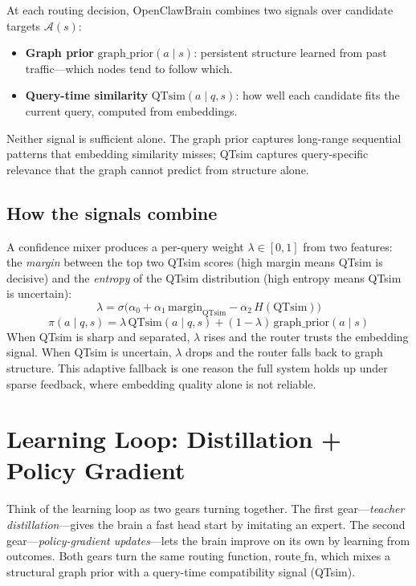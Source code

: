 \documentclass[11pt]{article}
\begin{document}
At each routing decision, OpenClawBrain combines two signals over candidate
targets $\mathcal{A}(s)$:
\begin{itemize}
  \item \textbf{Graph prior} $\mathrm{graph\_prior}(a\mid s)$: persistent
        structure learned from past traffic---which nodes tend to follow which.
  \item \textbf{Query-time similarity} $\mathrm{QTsim}(a\mid q,s)$: how well
        each candidate fits the current query, computed from embeddings.
\end{itemize}
Neither signal is sufficient alone. The graph prior captures long-range
sequential patterns that embedding similarity misses; QTsim captures
query-specific relevance that the graph cannot predict from structure alone.

\subsection{How the signals combine}
\label{sec:mixing}

A confidence mixer produces a per-query weight $\lambda \in [0,1]$ from two
features: the \emph{margin} between the top two QTsim scores (high margin means
QTsim is decisive) and the \emph{entropy} of the QTsim distribution (high
entropy means QTsim is uncertain):
\[
\lambda = \sigma\!\big(\alpha_0 + \alpha_1\,\mathrm{margin}_{\mathrm{QTsim}}
  - \alpha_2\,H(\mathrm{QTsim})\big)
\]
\[
\pi(a\mid q,s) = \lambda\,\mathrm{QTsim}(a\mid q,s)
  + (1-\lambda)\,\mathrm{graph\_prior}(a\mid s)
\]
When QTsim is sharp and separated, $\lambda$ rises and the router trusts the
embedding signal. When QTsim is uncertain, $\lambda$ drops and the router falls
back to graph structure. This adaptive fallback is one reason the full system
holds up under sparse feedback, where embedding quality alone is not reliable.

\section{Learning Loop: Distillation + Policy Gradient}
\label{sec:learning}

Think of the learning loop as two gears turning together. The first
gear---\emph{teacher distillation}---gives the brain a fast head start by
imitating an expert. The second gear---\emph{policy-gradient updates}---lets
the brain improve on its own by learning from outcomes. Both gears turn the
same routing function, $\mathrm{route\_fn}$, which mixes a structural graph
prior with a query-time compatibility signal (QTsim).
\end{document}

